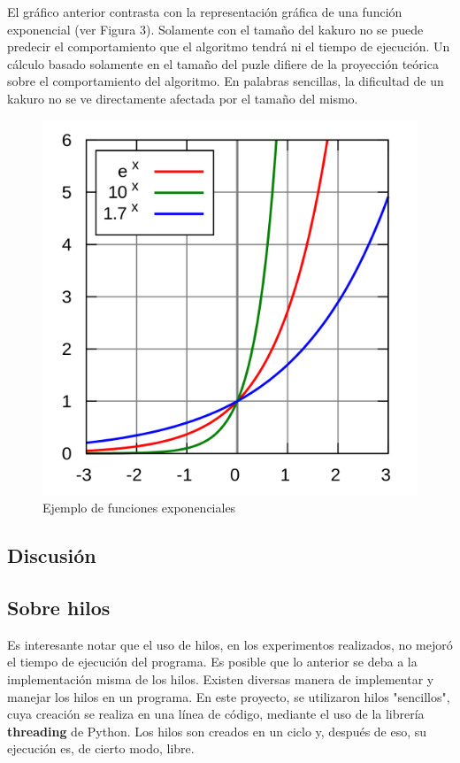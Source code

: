 \documentclass[conference]{IEEEtran}
\begin{document}
    El gráfico anterior contrasta con la representación gráfica de una función exponencial (ver Figura 3). Solamente con el tamaño del kakuro no se puede predecir el comportamiento que el algoritmo tendrá ni el tiempo de ejecución. Un cálculo basado solamente en el tamaño del puzle difiere de la proyección teórica sobre el comportamiento del algoritmo. En palabras sencillas, la dificultad de un kakuro no se ve directamente afectada por el tamaño del mismo. 

\begin{figure}
	\includegraphics[scale=0.2]{exponencial.png}
	\caption{Ejemplo de funciones exponenciales}
\end{figure}


\subsection{Discusión}

\subsection*{Sobre hilos}
    Es interesante notar que el uso de hilos, en los experimentos realizados, no mejoró el tiempo de ejecución del programa. Es posible que lo anterior se deba a la implementación misma de los hilos. Existen diversas manera de implementar y manejar los hilos en un programa. En este proyecto, se utilizaron hilos "sencillos", cuya creación se realiza en una línea de código, mediante el uso de la librería \textbf{threading} de Python. Los hilos son creados en un ciclo y, después de eso, su ejecución es, de cierto modo, libre.\newline
    
\end{document}
